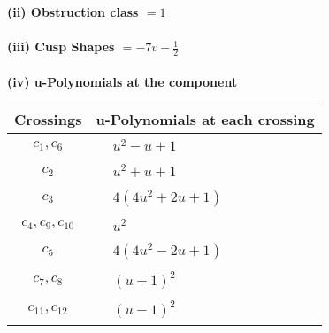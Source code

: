 \documentclass[1p]{elsarticle_modified}
\theoremstyle{definition}
\begin{document}
\flushleft \textbf{(ii) Obstruction class $= 1$}\\~\\
\flushleft \textbf{(iii) Cusp Shapes $= -7 v-\frac{1}{2}$}\\~\\
\newpage\renewcommand{\arraystretch}{1}
\flushleft \textbf{(iv) u-Polynomials at the component}\newline \\
\begin{tabular}{m{50pt}|m{274pt}}
Crossings & \hspace{64pt}u-Polynomials at each crossing \\
\hline $$\begin{aligned}c_{1},c_{6}\end{aligned}$$&$\begin{aligned}
&u^2- u+1
\end{aligned}$\\
\hline $$\begin{aligned}c_{2}\end{aligned}$$&$\begin{aligned}
&u^2+u+1
\end{aligned}$\\
\hline $$\begin{aligned}c_{3}\end{aligned}$$&$\begin{aligned}
&4(4 u^2+2 u+1)
\end{aligned}$\\
\hline $$\begin{aligned}c_{4},c_{9},c_{10}\end{aligned}$$&$\begin{aligned}
&u^2
\end{aligned}$\\
\hline $$\begin{aligned}c_{5}\end{aligned}$$&$\begin{aligned}
&4(4 u^2-2 u+1)
\end{aligned}$\\
\hline $$\begin{aligned}c_{7},c_{8}\end{aligned}$$&$\begin{aligned}
&(u+1)^2
\end{aligned}$\\
\hline $$\begin{aligned}c_{11},c_{12}\end{aligned}$$&$\begin{aligned}
&(u-1)^2
\end{aligned}$\\
\hline
\end{tabular}\\~\\
\end{document}
